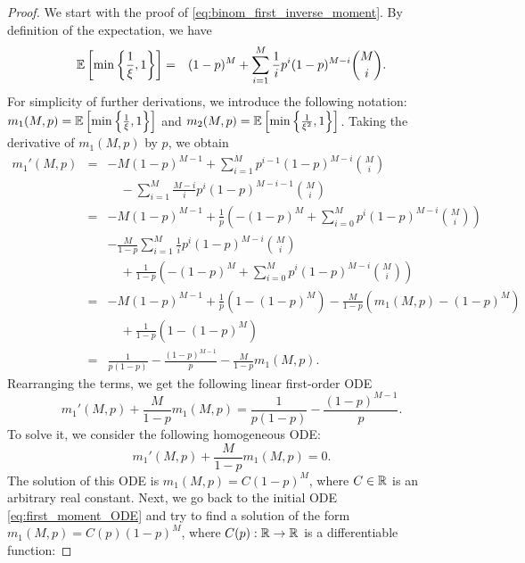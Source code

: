 \begin{proof}
    We start with the proof of \eqref{eq:binom_first_inverse_moment}. By definition of the expectation, we have
    \begin{eqnarray*}
        \mathbb{E}\left[\min\left\{\frac{1}{\xi},1\right\}\right] &=& (1-p)^M + \sum\limits_{i=1}^M \frac{1}{i}p^i(1-p)^{M-i}\binom{M}{i}.
    \end{eqnarray*}
    For simplicity of further derivations, we introduce the following notation: $m_1(M,p) = \mathbb{E}\left[\min\left\{\frac{1}{\xi},1\right\}\right]$ and $m_2(M,p) = \mathbb{E}\left[\min\left\{\frac{1}{\xi^2},1\right\}\right]$. Taking the derivative of $m_1(M,p)$ by $p$, we obtain
    \begin{eqnarray*}
        m_1'(M,p) &=& -M(1-p)^{M-1} + \sum\limits_{i=1}^Mp^{i-1}(1-p)^{M-i}\binom{M}{i} \\
        &&\quad - \sum\limits_{i=1}^M\frac{M-i}{i}p^i(1-p)^{M-i-1}\binom{M}{i}\\
        &=& -M(1-p)^{M-1} + \frac{1}{p}\left(-(1-p)^M + \sum\limits_{i=0}^Mp^{i}(1-p)^{M-i}\binom{M}{i}\right)\\
        && - \frac{M}{1-p}\sum\limits_{i=1}^M\frac{1}{i}p^i(1-p)^{M-i}\binom{M}{i}\\
        &&\quad + \frac{1}{1-p}\left(-(1-p)^M + \sum\limits_{i=0}^Mp^i(1-p)^{M-i}\binom{M}{i}\right)\\
        &=& -M(1-p)^{M-1} + \frac{1}{p}\left(1 - (1-p)^M\right) - \frac{M}{1-p}\left(m_1(M,p) - (1-p)^M\right)\\
        &&\quad+ \frac{1}{1-p}\left(1- (1-p)^M\right)\\
        &=& \frac{1}{p(1-p)} - \frac{(1-p)^{M-1}}{p} - \frac{M}{1-p}m_1(M,p).
    \end{eqnarray*}
    Rearranging the terms, we get the following linear first-order ODE
    \begin{equation}
        m_1'(M,p) + \frac{M}{1-p}m_1(M,p) = \frac{1}{p(1-p)} - \frac{(1-p)^{M-1}}{p}. \label{eq:first_moment_ODE}
    \end{equation}
    To solve it, we consider the following homogeneous ODE:
    \begin{equation*}
        m_1'(M,p) + \frac{M}{1-p}m_1(M,p) = 0.
    \end{equation*}
    The solution of this ODE is $m_1(M,p) = C(1-p)^M$, where $C\in\mathbb{R}$ is an arbitrary real constant. Next, we go back to the initial ODE \eqref{eq:first_moment_ODE} and try to find a solution of the form $m_1(M,p) = C(p)(1-p)^M$, where $C(p):\mathbb{R} \to \mathbb{R}$ is a differentiable function:

\end{proof}
